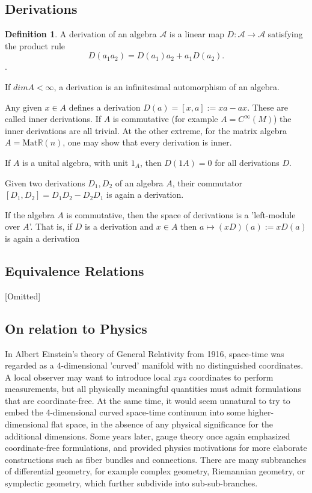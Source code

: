 \documentclass{article}
\theoremstyle{definition}
\newtheorem{defn}[theorem]{Definition}
\newenvironment{definition}
  {\vspace{8pt}\begin{mdframed}[backgroundcolor=blueish]\begin{defn}}
  {\end{defn}\end{mdframed}\vspace{4pt}}
\begin{document}
\subsection{Derivations}
\begin{definition}
A derivation of an algebra $\mathscr A$ is a linear map $D : \mathscr A \rightarrow \mathscr A$ satisfying the product rule 
\[
    D(a_1 a_2) = D(a_1)a_2 +a_1D(a_2).
\].
\end{definition}

If $dim A < \infty$, a derivation is an infinitesimal automorphism of an algebra.

Any given $x \in A$ defines a derivation $D(a) = [x,a] := xa-ax$. These are called inner derivations. If $A$ is commutative (for example $A = C ^\infty(M)$) the inner derivations are all trivial. At the other extreme, for the matrix algebra $A = \text{Mat}\mathbb R(n)$, one may show that every derivation is inner.

If $A$ is a unital algebra, with unit $1_A$, then $D(1A) = 0$ for all derivations $D$.

Given two derivations $D_1,D_2$ of an algebra $A$, their commutator $[D_1,D_2] = D_1 D_2 - D_2 D_1$ is again a derivation.

If the algebra $A$ is commutative, then the space of derivations is a 'left-module over $A$'. That is, if $D$ is a derivation and $x \in A$ then $a \mapsto (xD)(a) := xD(a)$ is again a derivation

\subsection{Equivalence Relations}
[Omitted]

\subsection{On relation to Physics}
In Albert Einstein’s theory of General Relativity from 1916, space-time was regarded as a 4-dimensional 'curved' manifold with no distinguished coordinates. A local observer may want to introduce local $xyz$ coordinates to perform measurements, but all physically meaningful quantities must admit formulations that are coordinate-free. At the same time, it would seem unnatural to try to embed the 4-dimensional curved space-time continuum into some higher-dimensional flat space, in the absence of any physical significance for the additional dimensions. Some years later, gauge theory once again emphasized coordinate-free formulations, and provided physics motivations for more elaborate constructions such as fiber bundles and connections. There are many subbranches of differential geometry, for example complex geometry, Riemannian geometry, or symplectic geometry, which further subdivide into sub-sub-branches.
\end{document}
